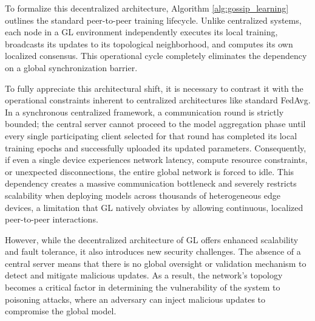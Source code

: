 To formalize this decentralized architecture, Algorithm \ref{alg:gossip_learning} outlines the standard peer-to-peer training lifecycle. Unlike centralized systems, each node in a GL environment independently executes its local training, broadcasts its updates to its topological neighborhood, and computes its own localized consensus. This operational cycle completely eliminates the dependency on a global synchronization barrier.

To fully appreciate this architectural shift, it is necessary to contrast it with the operational constraints inherent to centralized architectures like standard FedAvg. In a synchronous centralized framework, a communication round is strictly bounded; the central server cannot proceed to the model aggregation phase until every single participating client selected for that round has completed its local training epochs and successfully uploaded its updated parameters. Consequently, if even a single device experiences network latency, compute resource constraints, or unexpected disconnections, the entire global network is forced to idle. This dependency creates a massive communication bottleneck and severely restricts scalability when deploying models across thousands of heterogeneous edge devices, a limitation that GL natively obviates by allowing continuous, localized peer-to-peer interactions.

However, while the decentralized architecture of GL offers enhanced scalability and fault tolerance, it also introduces new security challenges. The absence of a central server means that there is no global oversight or validation mechanism to detect and mitigate malicious updates. As a result, the network's topology becomes a critical factor in determining the vulnerability of the system to poisoning attacks, where an adversary can inject malicious updates to compromise the global model. 